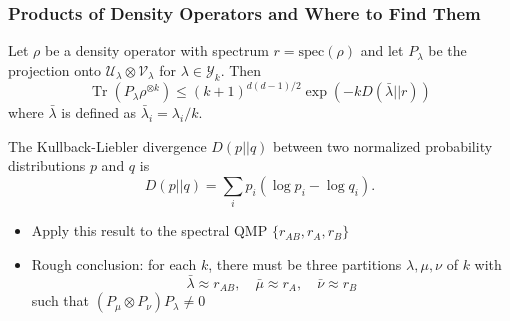 \documentclass[
    9pt,
    hyperref={bookmarks=false, colorlinks=false}, %
    xcolor={dvipsnames},
]{beamer}
\DeclareMathOperator{\Tr}{Tr}
\begin{document}
\begin{frame}
    \frametitle{Products of Density Operators and Where to Find Them}
    \begin{theorem}
        Let $\rho$ be a density operator with spectrum $r = \mathrm{spec}(\rho)$ and let $P_\lambda$ be the projection onto $\mathcal U_\lambda \otimes \mathcal V_\lambda$ for $\lambda \in \mathcal Y_k$. Then
        \[ \Tr ( P_\lambda \rho^{\otimes k} ) \leq (k + 1)^{d(d-1)/2} \exp ( - k D(\bar \lambda || r  )) \]
        where $\bar \lambda$ is defined as $\bar \lambda_i = \lambda_i / k$.
    \end{theorem}
    \begin{definition}[KL Divergence]
        The Kullback-Liebler divergence $D(p ||q)$ between two normalized probability distributions $p$ and $q$ is
        \[ D(p || q) = {\sum}_{i} p_i ( \log p_i - \log q_i ). \]
    \end{definition}
    \begin{itemize}
        \item Apply this result to the spectral QMP $\{ r_{AB}, r_{A}, r_{B} \}$
        \item Rough conclusion: for each $k$, there must be three partitions $\lambda, \mu, \nu$ of $k$ with
            \[ \bar \lambda \approx r_{AB}, \quad \bar \mu \approx r_{A}, \quad \bar \nu \approx r_{B} \]
            such that $(P_{\mu} \otimes P_{\nu}) P_{\lambda} \neq 0$
    \end{itemize}
\end{frame}
\end{document}
